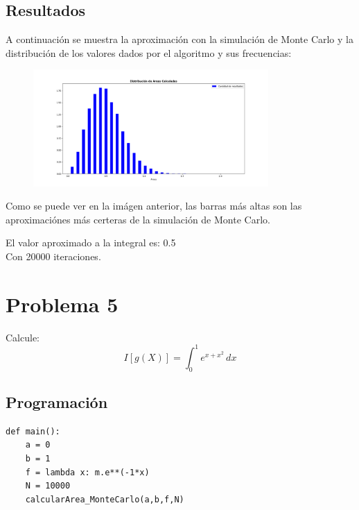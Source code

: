 \documentclass[a4paper,12pt]{article}
\begin{document}
\subsection{Resultados}
A continuación se muestra la aproximación con la simulación de Monte Carlo y 
la distribución de los valores dados por el algoritmo y sus frecuencias:
\begin{figure}[h]
    \centering
    \includegraphics[width=0.8\textwidth]{ejer4.png}
\end{figure}

Como se puede ver en la imágen anterior, las barras más altas son 
las aproximaciónes más certeras de la simulación de Monte Carlo.

El valor aproximado a la integral es: 0.5\\
Con 20000 iteraciones.

\section{Problema 5}
    Calcule:
    \begin{equation}
        I[g(X)] = \int_{0}^{1} e^{x+x^2} \,dx
    \end{equation}
    \subsection{Programación}
\begin{lstlisting}
def main():
    a = 0
    b = 1
    f = lambda x: m.e**(-1*x) 
    N = 10000
    calcularArea_MonteCarlo(a,b,f,N)
\end{lstlisting}
\end{document}

